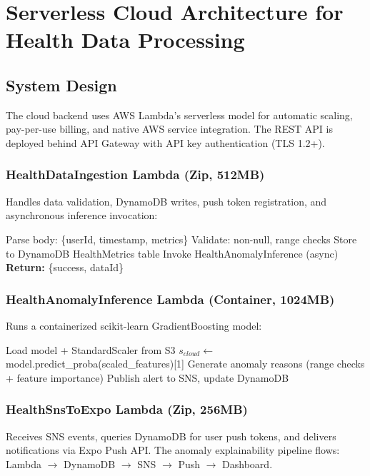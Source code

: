 \documentclass[conference]{IEEEtran}
\begin{document}

\section{Serverless Cloud Architecture for Health Data Processing}

\subsection{System Design}

The cloud backend uses AWS Lambda's serverless model for automatic scaling, pay-per-use billing, and native AWS service integration. The REST API is deployed behind API Gateway with API key authentication (TLS 1.2+).

\subsubsection{HealthDataIngestion Lambda (Zip, 512MB)}
Handles data validation, DynamoDB writes, push token registration, and asynchronous inference invocation:
\begin{algorithmic}
\STATE Parse body: \{userId, timestamp, metrics\}
\STATE Validate: non-null, range checks
\STATE Store to DynamoDB HealthMetrics table
    \STATE Invoke HealthAnomalyInference (async)
\ENDIF
\STATE \textbf{Return:} \{success, dataId\}
\end{algorithmic}

\subsubsection{HealthAnomalyInference Lambda (Container, 1024MB)}
Runs a containerized scikit-learn GradientBoosting model:
\begin{algorithmic}
\STATE Load model + StandardScaler from S3
\STATE $s_{cloud} \leftarrow$ model.predict\_proba(scaled\_features)[1]
\STATE Generate anomaly reasons (range checks + feature importance)
    \STATE Publish alert to SNS, update DynamoDB
\ENDIF
\end{algorithmic}

\subsubsection{HealthSnsToExpo Lambda (Zip, 256MB)}
Receives SNS events, queries DynamoDB for user push tokens, and delivers notifications via Expo Push API. The anomaly explainability pipeline flows: Lambda $\rightarrow$ DynamoDB $\rightarrow$ SNS $\rightarrow$ Push $\rightarrow$ Dashboard.
\end{document}
